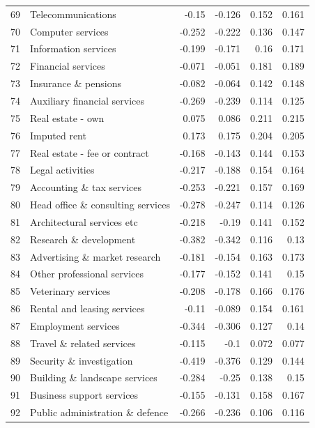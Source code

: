 \begin{longtable}{@{\extracolsep{\fill}}rlrrrr@{}}
    69    & Telecommunications & -0.15 & -0.126 & 0.152 & 0.161 \\
    70    & Computer services & -0.252 & -0.222 & 0.136 & 0.147 \\
    71    & Information services & -0.199 & -0.171 & 0.16  & 0.171 \\
    72    & Financial services & -0.071 & -0.051 & 0.181 & 0.189 \\
    73    & Insurance \& pensions & -0.082 & -0.064 & 0.142 & 0.148 \\
    74    & Auxiliary financial services & -0.269 & -0.239 & 0.114 & 0.125 \\
    75    & Real estate - own & 0.075 & 0.086 & 0.211 & 0.215 \\
    76    & Imputed rent & 0.173 & 0.175 & 0.204 & 0.205 \\
    77    & Real estate - fee or contract & -0.168 & -0.143 & 0.144 & 0.153 \\
    78    & Legal activities & -0.217 & -0.188 & 0.154 & 0.164 \\
    79    & Accounting \& tax services & -0.253 & -0.221 & 0.157 & 0.169 \\
    80    & Head office \& consulting services & -0.278 & -0.247 & 0.114 & 0.126 \\
    81    & Architectural services etc & -0.218 & -0.19 & 0.141 & 0.152 \\
    82    & Research \& development & -0.382 & -0.342 & 0.116 & 0.13 \\
    83    & Advertising \& market research & -0.181 & -0.154 & 0.163 & 0.173 \\
    84    & Other professional services & -0.177 & -0.152 & 0.141 & 0.15 \\
    85    & Veterinary services & -0.208 & -0.178 & 0.166 & 0.176 \\
    86    & Rental and leasing services & -0.11 & -0.089 & 0.154 & 0.161 \\
    87    & Employment services & -0.344 & -0.306 & 0.127 & 0.14 \\
    88    & Travel \& related services & -0.115 & -0.1  & 0.072 & 0.077 \\
    89    & Security \& investigation & -0.419 & -0.376 & 0.129 & 0.144 \\
    90    & Building \& landscape services & -0.284 & -0.25 & 0.138 & 0.15 \\
    91    & Business support services & -0.155 & -0.131 & 0.158 & 0.167 \\
    92    & Public administration \& defence & -0.266 & -0.236 & 0.106 & 0.116 \\

\end{longtable}
